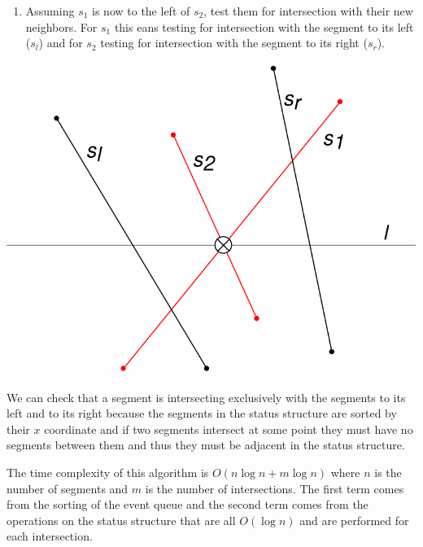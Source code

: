 \begin{enumerate}
\begin{enumerate}
\begin{minipage}{0.6\textwidth}
\begin{enumerate}
                            \item Assuming $s_1$ is now to the left of $s_2$, test them for intersection with their new neighbors. For $s_1$ this eans testing for intersection with the segment to its left ($s_l$) and for $s_2$ testing for intersection with the segment to its right ($s_r$).
                        \end{enumerate}
                    \end{minipage}
                    \hfill
                    \begin{minipage}{0.3\textwidth}
                        \centering
                        \includegraphics[width=\textwidth]{images/intersection.png}
                    \end{minipage}
          \end{enumerate}
\end{enumerate}

We can check that a segment is intersecting exclusively with the segments to its left and to its right because the segments in the status structure are sorted by their $x$ coordinate and if two segments intersect at some point they must have no segments between them and thus they must be adjacent in the status structure.

The time complexity of this algorithm is $O(n\log n + m \log n)$ where $n$ is the number of segments and $m$ is the number of intersections. The first term comes from the sorting of the event queue and the second term comes from the operations on the status structure that are all $O(\log n)$ and are performed for each intersection.


